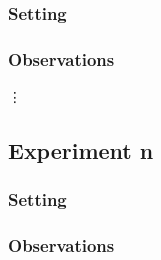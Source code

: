 \documentclass[11pt]{article}
\begin{document}
\subsubsection{Setting}

\subsubsection{Observations}

\vdots

\subsection{Experiment n}

\subsubsection{Setting}

\subsubsection{Observations}
\end{document}
